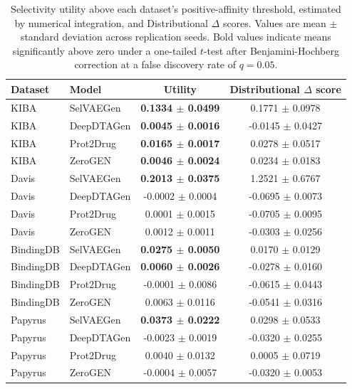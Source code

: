 \documentclass[a4paper,12pt]{article}
\begin{document}
\begin{table}[ht]
    \centering
    \caption[Selectivity estimates across datasets.]{Selectivity utility above each dataset's positive-affinity threshold, estimated by numerical integration, and Distributional $\Delta$ scores. Values are mean $\pm$ standard deviation across replication seeds. Bold values indicate means significantly above zero under a one-tailed $t$-test after Benjamini-Hochberg correction at a false discovery rate of $q=0.05$.}
    \label{tab:integrals}
    \begin{tabular}{llcc}
        \toprule
        Dataset & Model
        & Utility
        & Distributional $\Delta$ score \\
        \midrule

        KIBA & SelVAEGen
        & \textbf{0.1334 $\pm$ 0.0499}
        & 0.1771 $\pm$ 0.0978 \\
        KIBA & DeepDTAGen
        & \textbf{0.0045 $\pm$ 0.0016}
        & -0.0145 $\pm$ 0.0427 \\
        KIBA & Prot2Drug
        & \textbf{0.0165 $\pm$ 0.0017}
        & 0.0278 $\pm$ 0.0517 \\
        KIBA & ZeroGEN
        & \textbf{0.0046 $\pm$ 0.0024}
        & 0.0234 $\pm$ 0.0183 \\
        \midrule

        Davis & SelVAEGen
        & \textbf{0.2013 $\pm$ 0.0375}
        & 1.2521 $\pm$ 0.6767 \\
        Davis & DeepDTAGen
        & -0.0002 $\pm$ 0.0004
        & -0.0695 $\pm$ 0.0073 \\
        Davis & Prot2Drug
        & 0.0001 $\pm$ 0.0015
        & -0.0705 $\pm$ 0.0095 \\
        Davis & ZeroGEN
        & 0.0012 $\pm$ 0.0011
        & -0.0303 $\pm$ 0.0256 \\
        \midrule

        BindingDB & SelVAEGen
        & \textbf{0.0275 $\pm$ 0.0050}
        & 0.0170 $\pm$ 0.0129 \\
        BindingDB & DeepDTAGen
        & \textbf{0.0060 $\pm$ 0.0026}
        & -0.0278 $\pm$ 0.0160 \\
        BindingDB & Prot2Drug
        & -0.0001 $\pm$ 0.0086
        & -0.0615 $\pm$ 0.0443 \\
        BindingDB & ZeroGEN
        & 0.0063 $\pm$ 0.0116
        & -0.0541 $\pm$ 0.0316 \\
        \midrule

        Papyrus & SelVAEGen
        & \textbf{0.0373 $\pm$ 0.0222}
        & 0.0298 $\pm$ 0.0533 \\
        Papyrus & DeepDTAGen
        & -0.0023 $\pm$ 0.0019
        & -0.0320 $\pm$ 0.0255 \\
        Papyrus & Prot2Drug
        & 0.0040 $\pm$ 0.0132
        & 0.0005 $\pm$ 0.0719 \\
        Papyrus & ZeroGEN
        & -0.0004 $\pm$ 0.0057
        & -0.0320 $\pm$ 0.0053 \\

        \bottomrule
    \end{tabular}
\end{table}
\end{document}
